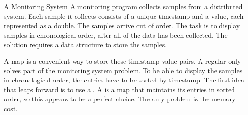 







 \begin{example}{A Monitoring System}
   A monitoring program collects samples from a distributed
   system. Each sample it collects consists of a unique timestamp and a
   value, each represented as a double. The samples arrive out of
   order. The task is to display samples in chronological order, after all of
   the data has been collected. The solution requires a data structure to store
   the samples.
\end{example}

A map is a convenient way to store these timestamp-value pairs. A regular
 only solves part of the monitoring system problem. To be able
to display the samples in chronological order, the entries have to be sorted by
timestamp.
The first idea that leaps forward is to use a . A
 is a map that maintains its entries in sorted order, so this
appears to be a perfect choice. The only problem is the memory cost.

